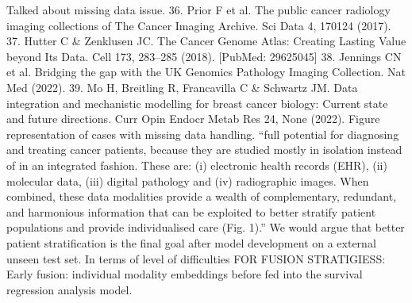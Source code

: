 \documentclass{article}%
\begin{document}
%
Talked about missing data issue. %
\newline%
\newline%
%
%
\newline%
\newline%
%
36. Prior F et al. The public cancer radiology imaging collections of The Cancer Imaging Archive. Sci Data 4, 170124 (2017). %
\newline%
\newline%
%
37. Hutter C \& Zenklusen JC. The Cancer Genome Atlas: Creating Lasting Value beyond Its Data. Cell 173, 283–285 (2018). {[}PubMed: 29625045{]} %
\newline%
\newline%
%
38. Jennings CN et al. Bridging the gap with the UK Genomics Pathology Imaging Collection. Nat Med (2022). %
\newline%
\newline%
%
39. Mo H, Breitling R, Francavilla C \& Schwartz JM. Data integration and mechanistic modelling for breast cancer biology: Current state and future directions. Curr Opin Endocr Metab Res 24, None (2022).%
\newline%
\newline%
%
%
\newline%
\newline%
%
Figure representation of cases with missing data handling. %
\newline%
\newline%
%
“full potential for diagnosing and treating cancer patients, because they are studied mostly in isolation instead of in an integrated fashion. These are: (i) electronic health records (EHR), (ii) molecular data, (iii) digital pathology and (iv) radiographic images. When combined, these data modalities provide a wealth of complementary, redundant, and harmonious information that can be exploited to better stratify patient populations and provide individualised care (Fig. 1).”%
\newline%
\newline%
%
We would argue that better patient stratification is the final goal after model development on a external unseen test set. %
\newline%
\newline%
%
In terms of level of difficulties FOR FUSION STRATIGIESS:%
\newline%
\newline%
%
Early fusion: individual modality embeddings before fed into the survival regression analysis model.%
\newline%
\end{document}
